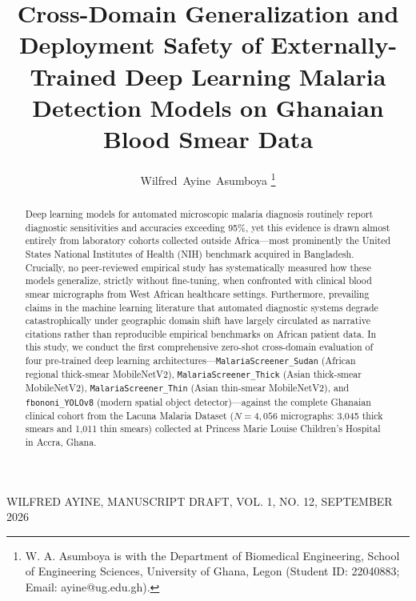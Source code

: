 \documentclass[10pt,journal,compsoc]{IEEEtran}
\begin{document}
\title{Cross-Domain Generalization and Deployment Safety of Externally-Trained Deep Learning Malaria Detection Models on Ghanaian Blood Smear Data}

\author{Wilfred~Ayine~Asumboya%
\thanks{W. A. Asumboya is with the Department of Biomedical Engineering, School of Engineering Sciences, University of Ghana, Legon (Student ID: 22040883; Email: ayine@ug.edu.gh).}}

%
{WILFRED AYINE, MANUSCRIPT DRAFT, VOL. 1, NO. 12, SEPTEMBER 2026}

\maketitle

\begin{abstract}
Deep learning models for automated microscopic malaria diagnosis routinely report diagnostic sensitivities and accuracies exceeding 95\%, yet this evidence is drawn almost entirely from laboratory cohorts collected outside Africa---most prominently the United States National Institutes of Health (NIH) benchmark acquired in Bangladesh. Crucially, no peer-reviewed empirical study has systematically measured how these models generalize, strictly without fine-tuning, when confronted with clinical blood smear micrographs from West African healthcare settings. Furthermore, prevailing claims in the machine learning literature that automated diagnostic systems degrade catastrophically under geographic domain shift have largely circulated as narrative citations rather than reproducible empirical benchmarks on African patient data. 
In this study, we conduct the first comprehensive zero-shot cross-domain evaluation of four pre-trained deep learning architectures---\texttt{MalariaScreener\_Sudan} (African regional thick-smear MobileNetV2), \texttt{MalariaScreener\_Thick} (Asian thick-smear MobileNetV2), \texttt{MalariaScreener\_Thin} (Asian thin-smear MobileNetV2), and \texttt{fbononi\_YOLOv8} (modern spatial object detector)---against the complete Ghanaian clinical cohort from the Lacuna Malaria Dataset ($N = 4,056$ micrographs: 3,045 thick smears and 1,011 thin smears) collected at Princess Marie Louise Children's Hospital in Accra, Ghana.

\end{abstract}
\end{document}

